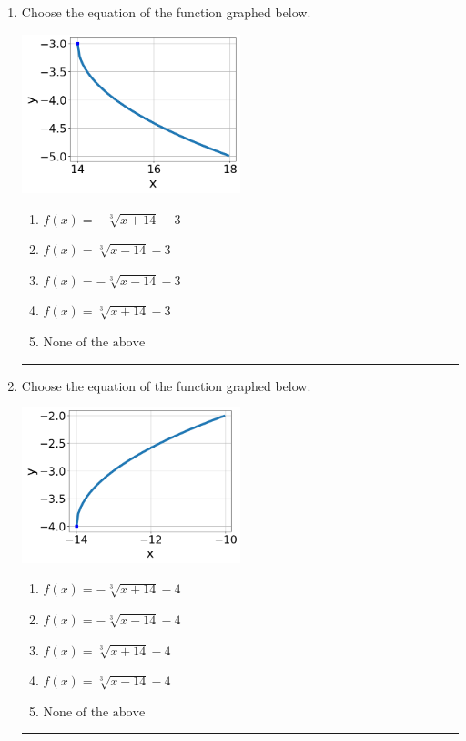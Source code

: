 \documentclass[14pt]{extbook}
\newcommand{\litem}[1]{\item#1\hspace*{-1cm}\rule{\textwidth}{0.4pt}}
\begin{document}
\begin{enumerate}
\litem{
Choose the equation of the function graphed below.
\begin{center}
    \includegraphics[width=0.5\textwidth]{../Figures/radicalGraphToEquationC.png}
\end{center}
\begin{enumerate}[label=\Alph*.]
\item \( f(x) = - \sqrt[3]{x + 14} - 3 \)
\item \( f(x) = \sqrt[3]{x - 14} - 3 \)
\item \( f(x) = - \sqrt[3]{x - 14} - 3 \)
\item \( f(x) = \sqrt[3]{x + 14} - 3 \)
\item \( \text{None of the above} \)

\end{enumerate} }
\litem{
Choose the equation of the function graphed below.
\begin{center}
    \includegraphics[width=0.5\textwidth]{../Figures/radicalGraphToEquationCopyC.png}
\end{center}
\begin{enumerate}[label=\Alph*.]
\item \( f(x) = - \sqrt[3]{x + 14} - 4 \)
\item \( f(x) = - \sqrt[3]{x - 14} - 4 \)
\item \( f(x) = \sqrt[3]{x + 14} - 4 \)
\item \( f(x) = \sqrt[3]{x - 14} - 4 \)
\item \( \text{None of the above} \)


\end{enumerate}}
\end{enumerate}
\end{document}
